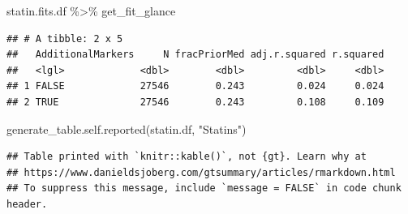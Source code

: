 \documentclass[
]{article}
\newenvironment{Shaded}{\begin{snugshade}}{\end{snugshade}}
\newcommand{\FunctionTok}[1]{\textcolor[rgb]{0.00,0.00,0.00}{#1}}
\newcommand{\NormalTok}[1]{#1}
\newcommand{\SpecialCharTok}[1]{\textcolor[rgb]{0.00,0.00,0.00}{#1}}
\newcommand{\StringTok}[1]{\textcolor[rgb]{0.31,0.60,0.02}{#1}}
\begin{document}
\begin{Shaded}
\begin{Highlighting}[]
\NormalTok{statin.fits.df }\SpecialCharTok{\%\textgreater{}\%} 
\NormalTok{  get\_fit\_glance}
\end{Highlighting}
\end{Shaded}

\begin{verbatim}
## # A tibble: 2 x 5
##   AdditionalMarkers     N fracPriorMed adj.r.squared r.squared
##   <lgl>             <dbl>        <dbl>         <dbl>     <dbl>
## 1 FALSE             27546        0.243         0.024     0.024
## 2 TRUE              27546        0.243         0.108     0.109
\end{verbatim}

\begin{Shaded}
\begin{Highlighting}[]
\FunctionTok{generate\_table.self.reported}\NormalTok{(statin.df, }\StringTok{"Statins"}\NormalTok{)}
\end{Highlighting}
\end{Shaded}

\begin{verbatim}
## Table printed with `knitr::kable()`, not {gt}. Learn why at
## https://www.danieldsjoberg.com/gtsummary/articles/rmarkdown.html
## To suppress this message, include `message = FALSE` in code chunk header.
\end{verbatim}
\end{document}
